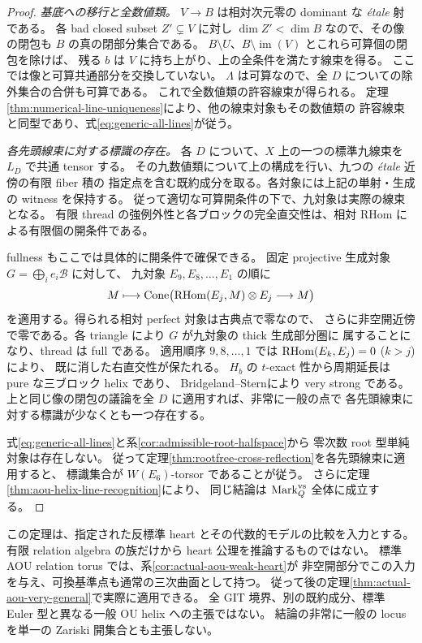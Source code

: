 \begin{proof}
\emph{基底への移行と全数値類。}
$V\to B$ は相対次元零の dominant な \textit{\'etale} 射である。
各 bad closed subset $Z'\subsetneq V$ に対し
$\dim Z'<\dim B$ なので、その像の閉包も $B$ の真の閉部分集合である。
$B\setminus U$、$B\setminus\operatorname{im}(V)$ とこれら可算個の閉包を除けば、
残る $b$ は $V$ に持ち上がり、上の全条件を満たす線束を得る。
ここでは像と可算共通部分を交換していない。
$\Lambda$ は可算なので、全 $D$ についての除外集合の合併も可算である。
これで全数値類の許容線束が得られる。
定理\ref{thm:numerical-line-uniqueness}により、他の線束対象もその数値類の
許容線束と同型であり、式\eqref{eq:generic-all-lines}が従う。

\emph{各先頭線束に対する標識の存在。}
各 $D$ について、$X$ 上の一つの標準九線束を $L_D$ で共通 tensor する。
その九数値類について上の構成を行い、九つの \textit{\'etale} 近傍の有限 fiber 積の
指定点を含む既約成分を取る。各対象には上記の単射・生成の witness を保持する。
従って適切な可算開条件の下で、九対象は実際の線束となる。
有限 thread の強例外性と各ブロックの完全直交性は、相対 RHom による有限個の開条件である。

fullness もここでは具体的に開条件で確保できる。
固定 projective 生成対象 $G=\bigoplus_i e_i\mathscr B$ に対して、
九対象 $E_9,E_8,\ldots,E_1$ の順に
\[
 M\longmapsto\operatorname{Cone}
 \bigl(\operatorname{RHom}(E_j,M)\otimes E_j\longrightarrow M\bigr)
\]
を適用する。得られる相対 perfect 対象は古典点で零なので、
さらに非空開近傍で零である。各 triangle により $G$ が九対象の thick 生成部分圏に
属することになり、thread は full である。
適用順序 $9,8,\ldots,1$ では $\operatorname{RHom}(E_k,E_j)=0$ ($k>j$) により、
既に消した右直交性が保たれる。
$H_b$ の $t$-exact 性から周期延長は pure な三ブロック helix であり、
Bridgeland--Stern\cite[Theorem 5.3(ii)]{BSHelices}により very strong である。
上と同じ像の閉包の議論を全 $D$ に適用すれば、非常に一般の点で
各先頭線束に対する標識が少なくとも一つ存在する。

式\eqref{eq:generic-all-lines}と系\ref{cor:admissible-root-halfspace}から
零次数 root 型単純対象は存在しない。
従って定理\ref{thm:rootfree-cross-reflection}を各先頭線束に適用すると、
標識集合が $W(E_6)$-torsor であることが従う。
さらに定理\ref{thm:aou-helix-line-recognition}により、
同じ結論は $\operatorname{Mark}^{\rm vs}_Q$ 全体に成立する。
\end{proof}

\begin{remark}\label{rem:generic-family-scope}
この定理は、指定された反標準 heart とその代数的モデルの比較を入力とする。
有限 relation algebra の族だけから heart 公理を推論するものではない。
標準 AOU relation torus では、系\ref{cor:actual-aou-weak-heart}が
非空開部分でこの入力を与え、可換基準点も通常の三次曲面として持つ。
従って後の定理\ref{thm:actual-aou-very-general}で実際に適用できる。
全 GIT 境界、別の既約成分、標準 Euler 型と異なる一般 OU helix への主張ではない。
結論の非常に一般の locus を単一の Zariski 開集合とも主張しない。
\end{remark}

